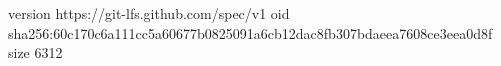 version https://git-lfs.github.com/spec/v1
oid sha256:60c170c6a111cc5a60677b0825091a6cb12dac8fb307bdaeea7608ce3eea0d8f
size 6312
